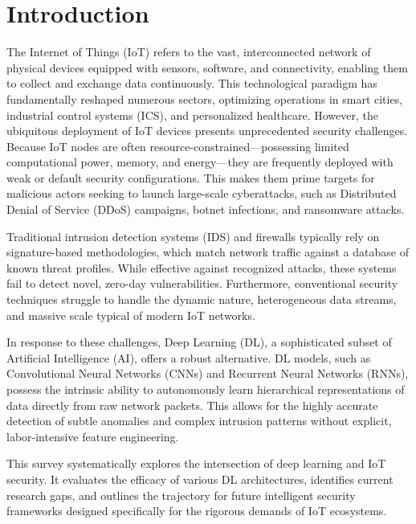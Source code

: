 \documentclass[conference]{IEEEtran}
\begin{document}
\section{Introduction}
The Internet of Things (IoT) refers to the vast, interconnected network of physical devices equipped with sensors, software, and connectivity, enabling them to collect and exchange data continuously. This technological paradigm has fundamentally reshaped numerous sectors, optimizing operations in smart cities, industrial control systems (ICS), and personalized healthcare. However, the ubiquitous deployment of IoT devices presents unprecedented security challenges. Because IoT nodes are often resource-constrained—possessing limited computational power, memory, and energy—they are frequently deployed with weak or default security configurations. This makes them prime targets for malicious actors seeking to launch large-scale cyberattacks, such as Distributed Denial of Service (DDoS) campaigns, botnet infections, and ransomware attacks.

Traditional intrusion detection systems (IDS) and firewalls typically rely on signature-based methodologies, which match network traffic against a database of known threat profiles. While effective against recognized attacks, these systems fail to detect novel, zero-day vulnerabilities. Furthermore, conventional security techniques struggle to handle the dynamic nature, heterogeneous data streams, and massive scale typical of modern IoT networks.

In response to these challenges, Deep Learning (DL), a sophisticated subset of Artificial Intelligence (AI), offers a robust alternative. DL models, such as Convolutional Neural Networks (CNNs) and Recurrent Neural Networks (RNNs), possess the intrinsic ability to autonomously learn hierarchical representations of data directly from raw network packets. This allows for the highly accurate detection of subtle anomalies and complex intrusion patterns without explicit, labor-intensive feature engineering. 

This survey systematically explores the intersection of deep learning and IoT security. It evaluates the efficacy of various DL architectures, identifies current research gaps, and outlines the trajectory for future intelligent security frameworks designed specifically for the rigorous demands of IoT ecosystems.
\end{document}
